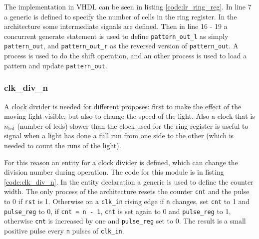 \documentclass[12pt]{article}   	%
\begin{document}
The implementation  in VHDL can be seen in listing \ref{code:lr_ring_reg}. In line 7 a generic is defined to specify the number of cells in the ring register. In the architecture some intermediate signals are defined. Then in line 16 - 19 a concurrent generate statement is used to define \lstinline{pattern_out_l} as simply \lstinline{pattern_out}, and \lstinline{pattern_out_r} as the reversed version of \lstinline{pattern_out}. A process is used to do the shift operation, and an other process is used to load a pattern and update \lstinline{pattern_out}.

\subsubsection{clk\_div\_n}
A clock divider is needed for different proposes: first to make the effect of the moving light visible, but also to change the speed of the light. Also a clock that is $n_\text{led}$ (number of leds) slower than the clock used for the ring register is useful to signal when a light has done a full run from one side to the other (which is needed to count the runs of the light).

For this reason an entity for a clock divider is defined, which can change the division number during operation. The code for this module is in listing \ref{code:clk_div_n}. In the entity declaration a generic is used to define the counter width. The only process of the architecture resets the counter \lstinline{cnt} and the pulse to 0 if \lstinline{rst} is 1. Otherwise on a \lstinline{clk_in} rising edge if \lstinline{n} changes, set \lstinline{cnt} to 1 and \lstinline{pulse_reg} to 0, if \lstinline{cnt = n - 1}, \lstinline{cnt} is set again to 0 and \lstinline{pulse_reg} to 1, otherwise \lstinline{cnt} is increased by one and \lstinline{pulse_reg} set to 0. The result is a small positive pulse every \lstinline{n} pulses of \lstinline{clk_in}.
\end{document}
